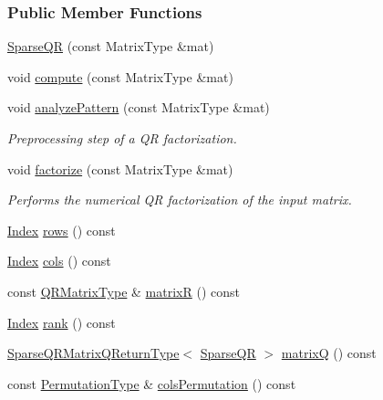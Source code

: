 \subsubsection*{Public Member Functions}
\begin{DoxyCompactItemize}
\item 
\hyperlink{group___sparse_q_r___module_ac50f705d686d4bc687ce6acbc76447d2}{Sparse\+QR} (const Matrix\+Type \&mat)
\item 
void \hyperlink{group___sparse_q_r___module_aedaf52b7543de4d55c58c8f830c2aeb7}{compute} (const Matrix\+Type \&mat)
\item 
void \hyperlink{group___sparse_q_r___module_a4b425ddb1358c914d764cde48853a4f6}{analyze\+Pattern} (const Matrix\+Type \&mat)
\begin{DoxyCompactList}\small\item\em Preprocessing step of a QR factorization. \end{DoxyCompactList}\item 
void \hyperlink{group___sparse_q_r___module_a55a34bacf05bd30a1dacbccad9f03c6d}{factorize} (const Matrix\+Type \&mat)
\begin{DoxyCompactList}\small\item\em Performs the numerical QR factorization of the input matrix. \end{DoxyCompactList}\item 
\hyperlink{namespace_eigen_a62e77e0933482dafde8fe197d9a2cfde}{Index} \hyperlink{group___sparse_q_r___module_ab9133b7ace1c19714df99f553666316d}{rows} () const
\item 
\hyperlink{namespace_eigen_a62e77e0933482dafde8fe197d9a2cfde}{Index} \hyperlink{group___sparse_q_r___module_a57bedc9b1351c0995bae8ad0088a6fce}{cols} () const
\item 
const \hyperlink{group___sparse_core___module}{Q\+R\+Matrix\+Type} \& \hyperlink{group___sparse_q_r___module_a564524ff13b2b6dd1e76127404f7b920}{matrixR} () const
\item 
\hyperlink{namespace_eigen_a62e77e0933482dafde8fe197d9a2cfde}{Index} \hyperlink{group___sparse_q_r___module_a70ec2b9e5cb62a41dc1ee2adfb54e9b0}{rank} () const
\item 
\hyperlink{struct_eigen_1_1_sparse_q_r_matrix_q_return_type}{Sparse\+Q\+R\+Matrix\+Q\+Return\+Type}$<$ \hyperlink{group___sparse_q_r___module_class_eigen_1_1_sparse_q_r}{Sparse\+QR} $>$ \hyperlink{group___sparse_q_r___module_ae1cc0a836c177d4f42600f8639354be1}{matrixQ} () const
\item 
const \hyperlink{group___core___module}{Permutation\+Type} \& \hyperlink{group___sparse_q_r___module_a140930ebbf89dfd57a173761716db38f}{cols\+Permutation} () const

\end{DoxyCompactItemize}
